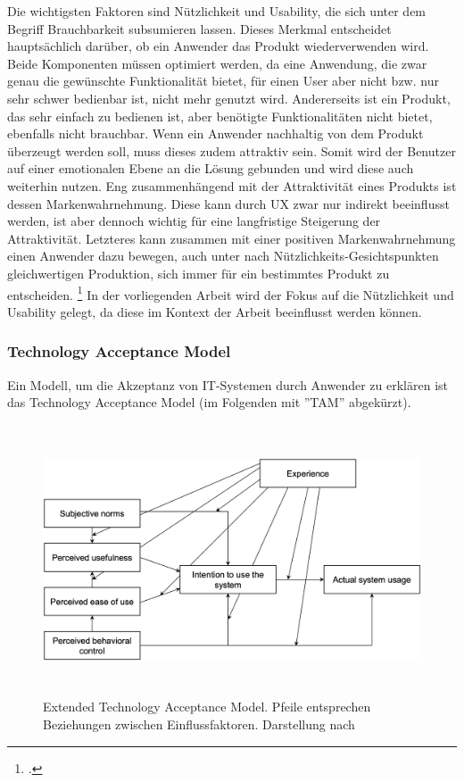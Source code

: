 Die wichtigsten Faktoren sind Nützlichkeit und Usability, die sich unter dem Begriff Brauchbarkeit subsumieren lassen. Dieses Merkmal entscheidet hauptsächlich darüber, ob ein Anwender das Produkt wiederverwenden wird. Beide Komponenten müssen optimiert werden, da eine Anwendung, die zwar genau die gewünschte Funktionalität bietet, für einen User aber nicht bzw. nur sehr schwer bedienbar ist, nicht mehr genutzt wird. Andererseits ist ein Produkt, das sehr einfach zu bedienen ist, aber benötigte Funktionalitäten nicht bietet, ebenfalls nicht brauchbar. Wenn ein Anwender nachhaltig von dem Produkt überzeugt werden soll, muss dieses zudem attraktiv sein. Somit wird der Benutzer auf einer emotionalen Ebene an die Lösung gebunden und wird diese auch weiterhin nutzen. Eng zusammenhängend mit der Attraktivität eines Produkts ist dessen Markenwahrnehmung. Diese kann durch UX zwar nur indirekt beeinflusst werden, ist aber dennoch wichtig für eine langfristige Steigerung der Attraktivität. Letzteres kann zusammen mit einer positiven Markenwahrnehmung einen Anwender dazu bewegen, auch unter nach Nützlichkeits-Gesichtspunkten gleichwertigen Produktion, sich immer für ein bestimmtes Produkt zu entscheiden. \footcite[Vgl.][S. 51f]{theorie_beyer_user_experience_mit_sap_2020} In der vorliegenden Arbeit wird der Fokus auf die Nützlichkeit und Usability gelegt, da diese im Kontext der Arbeit beeinflusst werden können.

\subsubsection{Technology Acceptance Model}

Ein Modell, um die Akzeptanz von IT-Systemen durch Anwender zu erklären ist das Technology Acceptance Model (im Folgenden mit ''TAM'' abgekürzt).

\begin{figure}[H]
    \centering
    \includegraphics[height=8.02cm]{Bilder/User-Experience_ETAM.png}
    \caption[Extended Technology Acceptance Model]{Extended Technology Acceptance Model. Pfeile entsprechen Beziehungen zwischen Einflussfaktoren. Darstellung nach \cite[][]{theorie_kohnke_extended_tam_2023}}
    \label{fig:User-Experience_ETAM}
\end{figure}


